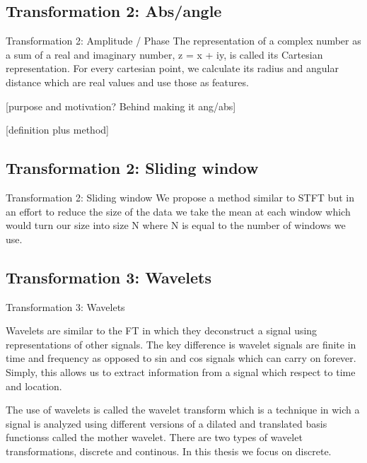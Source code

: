 \documentclass{turabian-thesis}
\begin{document}


\subsection{Transformation 2: Abs/angle}

Transformation 2: Amplitude / Phase
The representation of a complex number as a sum of a real and imaginary number, z = x + iy, is called its Cartesian representation. For every cartesian point, we calculate its radius and angular distance which are real values and use those as features.

[purpose and motivation? Behind making it ang/abs]

[definition plus method]



\subsection{Transformation 2: Sliding window }

Transformation 2: Sliding window 
We propose a method similar to STFT but in an effort to reduce the size of the data we take the mean at each window which would turn our size into size N where N is equal to the number of windows we use.

\subsection{Transformation 3: Wavelets}
Transformation 3: Wavelets

Wavelets are similar to the FT in which they deconstruct a signal using representations of other signals. The key difference is wavelet signals are finite in time and frequency as opposed to sin and cos signals which can carry on forever. Simply, this allows us to extract information from a signal which respect to time and location.

The use of wavelets is called the wavelet transform which is a technique in wich a signal is analyzed using different versions of a dilated and translated basis functionss called the mother wavelet. There are two types of wavelet transformations, discrete and continous. In this thesis we focus on discrete.
\end{document}
